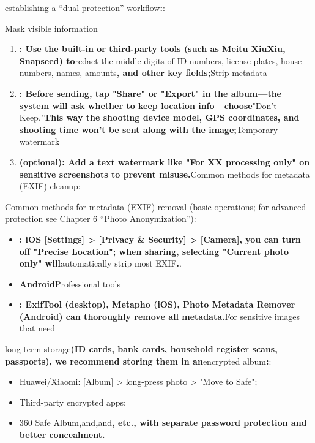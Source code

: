 establishing a “dual protection” workflow\textbf{:}:

\begin{tcbwarn}{Mask visible information}
\begin{enumerate}
  \item \textbf{: Use the built-in or third-party tools (such as Meitu XiuXiu, Snapseed) to}redact the middle digits of ID numbers, license plates, house numbers, names, amounts\textbf{, and other key fields;}Strip metadata
  \item \textbf{: Before sending, tap "Share" or "Export" in the album—the system will ask whether to keep location info—choose}"Don't Keep."\textbf{This way the shooting device model, GPS coordinates, and shooting time won't be sent along with the image;}Temporary watermark
  \item \textbf{(optional): Add a text watermark like "For XX processing only" on sensitive screenshots to prevent misuse.}Common methods for metadata (EXIF) cleanup:
\end{enumerate}

\end{tcbwarn}

Common methods for metadata (EXIF) removal (basic operations; for advanced protection see Chapter 6 “Photo Anonymization”):

\begin{itemize}
  \item \textbf{: iOS [Settings] > [Privacy \& Security] > [Camera], you can turn off "Precise Location"; when sharing, selecting "Current photo only" will}automatically strip most EXIF\textbf{.}.
  \item \textbf{Android}Professional tools
  \item \textbf{: ExifTool (desktop), Metapho (iOS), Photo Metadata Remover (Android) can thoroughly remove all metadata.}For sensitive images that need
\end{itemize}

long-term storage\textbf{(ID cards, bank cards, household register scans, passports), we recommend storing them in an}encrypted album\textbf{:}:

\begin{itemize}
  \item Huawei/Xiaomi: [Album] > long-press photo > "Move to Safe";
  \item Third-party encrypted apps:
  \item 360 Safe Album\textbf{,}and\textbf{,}and\textbf{, etc., with separate password protection and better concealment.}
\end{itemize}
